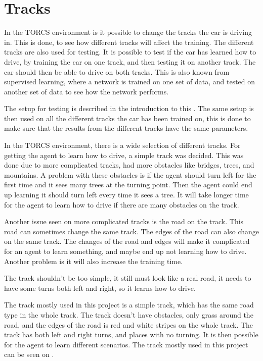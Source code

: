 \section{Tracks}\label{Tracks}
In the TORCS environment is it possible to change the tracks the car is driving in. This is done, to see how different tracks will affect the training. The different tracks are also used for testing. It is possible to test if the car has learned how to drive, by training the car on one track, and then testing it on another track. The car should then be able to drive on both tracks. This is also known from supervised learning, where a network is trained on one set of data, and tested on another set of data to see how the network performs.   

The setup for testing is described in the introduction to this . The same setup is then used on all the different tracks the car has been trained on, this is done to make sure that the results from the different tracks have the same parameters.  

In the TORCS environment, there is a wide selection of different tracks. For getting the agent to learn how to drive, a simple track was decided. This was done due to more complicated tracks, had more obstacles like bridges, trees, and mountains. A problem with these obstacles is if the agent should turn left for the first time and it sees many trees at the turning point. Then the agent could end up learning it should turn left every time it sees a tree. It will take longer time for the agent to learn how to drive if there are many obstacles on the track.   

Another issue seen on more complicated tracks is the road on the track. This road can sometimes change the same track. The edges of the road can also change on the same track. The changes of the road and edges will make it complicated for an agent to learn something, and maybe end up not learning how to drive. Another problem is it will also increase the training time. 

The track shouldn't be too simple, it still must look like a real road, it needs to have some turns both left and right, so it learns how to drive. 

The track mostly used in this project is a simple track, which has the same road type in the whole track. The track doesn't have obstacles, only grass around the road, and the edges of the road is red and white stripes on the whole track. The track has both left and right turns, and places with no turning. It is then possible for the agent to learn different scenarios. The track mostly used in this project can be seen on .

